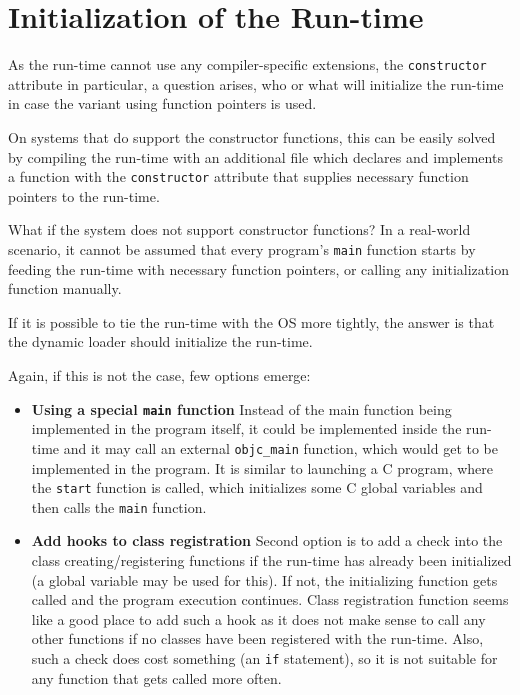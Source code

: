 \section{Initialization of the Run-time}

As the run-time cannot use any compiler-specific extensions, the \verb=constructor= attribute in particular, a question arises, who or what will initialize the run-time in case the variant using function pointers is used.

On systems that do support the constructor functions, this can be easily solved by compiling the run-time with an additional file which declares and implements a function with the \verb=constructor= attribute that supplies necessary function pointers to the run-time.

What if the system does not support constructor functions? In a real-world scenario, it cannot be assumed that every program's \verb=main= function starts by feeding the run-time with necessary function pointers, or calling any initialization function manually.

If it is possible to tie the run-time with the OS more tightly, the answer is that the dynamic loader should initialize the run-time.

Again, if this is not the case, few options emerge:

\begin{itemize}
  \item{\bf{Using a special \verb=main= function}} Instead of the main function being implemented in the program itself, it could be implemented inside the run-time and it may call an external \verb=objc_main= function, which would get to be implemented in the program. It is similar to launching a C program, where the \verb=start= function is called, which initializes some C global variables and then calls the \verb=main= function.
  \item{\bf{Add hooks to class registration}} Second option is to add a check into the class creating/registering functions if the run-time has already been initialized (a global variable may be used for this). If not, the initializing function gets called and the program execution continues. Class registration function seems like a good place to add such a hook as it does not make sense to call any other functions if no classes have been registered with the run-time. Also, such a check does cost something (an \verb=if= statement), so it is not suitable for any function that gets called more often.
\end{itemize}

